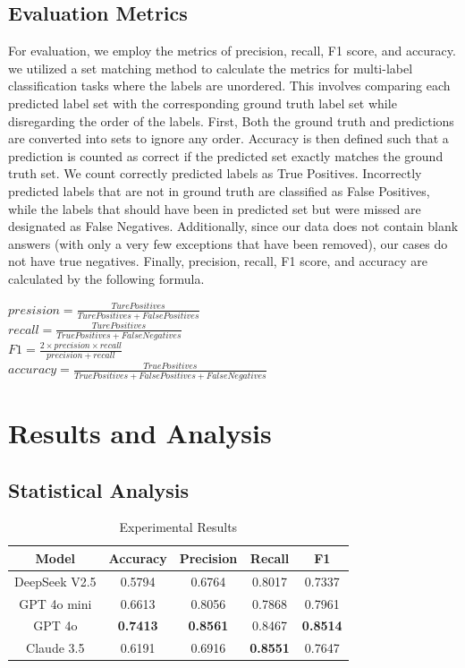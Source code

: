 \documentclass[a4paper]{article}
\begin{document}
\subsection{Evaluation Metrics}
For evaluation, we employ the metrics of precision, recall, F1 score, and accuracy. we utilized a set matching method to calculate the metrics 
for multi-label classification tasks where the labels are unordered. 
This involves comparing each predicted label set with the corresponding ground truth label set while disregarding the order of the labels. 
First, Both the ground truth and predictions are converted into sets to ignore any order. Accuracy is then defined such that a prediction is 
counted as correct if the predicted set exactly matches the ground truth set. We count correctly predicted labels as True Positives. 
Incorrectly predicted labels that are not in ground truth are classified as False Positives, while the labels that should have been in predicted set 
but were missed are designated as False Negatives. Additionally, since our data does not contain blank answers (with only a very few exceptions that have been removed), 
our cases do not have true negatives. Finally, precision, recall, F1 score, and accuracy are calculated by the following formula.
\begin{center}
$presision=\frac{Ture Positives}{Ture Positives + False Positives}$\\ [0.3 cm]
$recall=\frac{Ture Positives}{True Positives + False Negatives}$\\ [0.3 cm]
$F1=\frac{2 \times precision \times recall}{precision + recall}$\\ [0.3 cm]
$accuracy=\frac{True Positives}{True Positives + False Positives + False Negatives}$
\end{center}

\section{Results and Analysis}
\subsection{Statistical Analysis}

\begin{table}[h]
  \begin{center}
    \begin{tabular}{|c|c|c|c|c|}
    \hline
    \textbf{Model} & \textbf{Accuracy} & \textbf{Precision} & \textbf{Recall} & \textbf{F1} \\ \hline
    DeepSeek V2.5 & 0.5794 & 0.6764 & 0.8017 & 0.7337 \\ 
    GPT 4o mini & 0.6613 &0.8056 &0.7868 &0.7961 \\
    GPT 4o      &\textbf{0.7413} &\textbf{0.8561} &0.8467 &\textbf{0.8514} \\
    Claude 3.5  & 0.6191 & 0.6916 & \textbf{0.8551} & 0.7647 \\ \hline
    \end{tabular}
  \end{center}
  \caption{Experimental Results}
\end{table}
    
\end{document}
